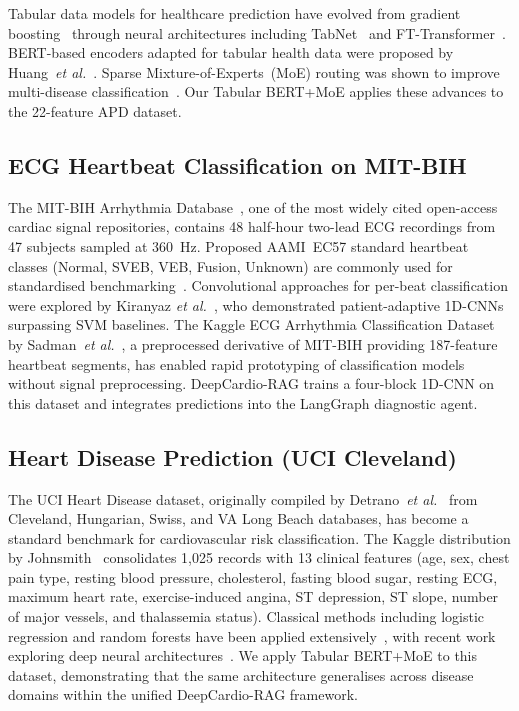 \documentclass[journal,10pt,twoside]{IEEEtran}
\begin{document}
Tabular data models for healthcare prediction have evolved from gradient
boosting~\cite{chen2016xgboost} through neural architectures including
TabNet~\cite{arik2021} and FT-Transformer~\cite{gorishniy2021}.
BERT-based encoders adapted for tabular health data were proposed by
Huang~\textit{et al.}~\cite{huang2020}.
Sparse Mixture-of-Experts~(MoE) routing was shown to improve multi-disease
classification~\cite{shazeer2017}.
Our Tabular BERT+MoE applies these advances to the 22-feature APD dataset.

\subsection{ECG Heartbeat Classification on MIT-BIH}

The MIT-BIH Arrhythmia Database~\cite{moody2001}, one of the most widely cited
open-access cardiac signal repositories, contains 48 half-hour two-lead ECG
recordings from 47 subjects sampled at 360~Hz.
Proposed AAMI~EC57 standard heartbeat classes (Normal, SVEB, VEB, Fusion, Unknown)
are commonly used for standardised benchmarking~\cite{de2004}.
Convolutional approaches for per-beat classification were explored by Kiranyaz
\textit{et al.}~\cite{kiranyaz2015}, who demonstrated patient-adaptive 1D-CNNs
surpassing SVM baselines.
The Kaggle ECG Arrhythmia Classification Dataset by Sadman~\textit{et al.}~\cite{sadmansakib2021},
a preprocessed derivative of MIT-BIH providing 187-feature heartbeat segments,
has enabled rapid prototyping of classification models without signal
preprocessing.
DeepCardio-RAG trains a four-block 1D-CNN on this dataset and integrates predictions
into the LangGraph diagnostic agent.

\subsection{Heart Disease Prediction (UCI Cleveland)}

The UCI Heart Disease dataset, originally compiled by
Detrano~\textit{et al.}~\cite{detrano1989} from Cleveland, Hungarian, Swiss, and
VA Long Beach databases, has become a standard benchmark for cardiovascular risk
classification.
The Kaggle distribution by Johnsmith~\cite{uci_heart} consolidates 1{,}025 records
with 13 clinical features (age, sex, chest pain type, resting blood pressure,
cholesterol, fasting blood sugar, resting ECG, maximum heart rate, exercise-induced
angina, ST depression, ST slope, number of major vessels, and thalassemia status).
Classical methods including logistic regression and random forests have been applied
extensively~\cite{mohan2019}, with recent work exploring deep neural
architectures~\cite{ali2021heart}.
We apply Tabular BERT+MoE to this dataset, demonstrating that the same
architecture generalises across disease domains within the unified
DeepCardio-RAG framework.
\end{document}
